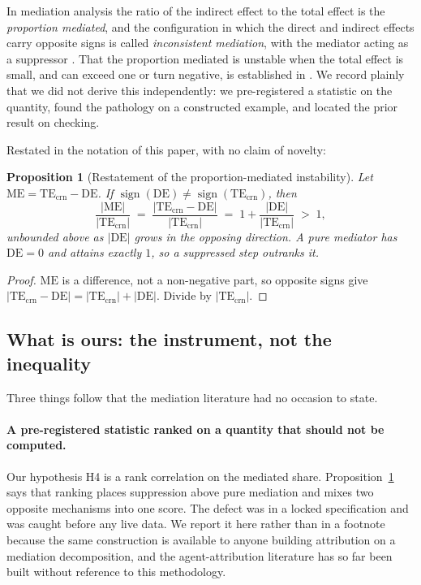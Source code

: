 \documentclass[11pt]{article}
\newtheorem{proposition}{Proposition}
\theoremstyle{remark}
\newcommand{\TEcrn}{\mathrm{TE}_{\mathrm{crn}}}
\newcommand{\DE}{\mathrm{DE}}
\newcommand{\ME}{\mathrm{ME}}
\begin{document}
In mediation analysis the ratio of the indirect effect to the total effect is
the \emph{proportion mediated}, and the configuration in which the direct and
indirect effects carry opposite signs is called \emph{inconsistent mediation},
with the mediator acting as a suppressor \citep{mackinnon2000,kenny_mediation}.
That the proportion mediated is unstable when the total effect is small, and can
exceed one or turn negative, is established in \citet{mackinnon1995}. We record
plainly that we did not derive this independently: we pre-registered a statistic
on the quantity, found the pathology on a constructed example, and located the
prior result on checking.

Restated in the notation of this paper, with no claim of novelty:

\begin{proposition}[Restatement of the proportion-mediated instability]
\label{prop:supp}
Let $\ME = \TEcrn - \DE$. If $\operatorname{sign}(\DE) \neq
\operatorname{sign}(\TEcrn)$, then
\[
  \frac{|\ME|}{|\TEcrn|} \;=\; \frac{|\TEcrn - \DE|}{|\TEcrn|}
  \;=\; 1 + \frac{|\DE|}{|\TEcrn|} \;>\; 1 ,
\]
unbounded above as $|\DE|$ grows in the opposing direction. A pure mediator has
$\DE = 0$ and attains exactly $1$, so a suppressed step outranks it.
\end{proposition}

\begin{proof}
$\ME$ is a difference, not a non-negative part, so opposite signs give
$|\TEcrn - \DE| = |\TEcrn| + |\DE|$. Divide by $|\TEcrn|$.
\end{proof}

\subsection{What is ours: the instrument, not the inequality}

Three things follow that the mediation literature had no occasion to state.

\paragraph{A pre-registered statistic ranked on a quantity that should not be
computed.} Our hypothesis H4 is a rank correlation on the mediated share.
Proposition~\ref{prop:supp} says that ranking places suppression above pure
mediation and mixes two opposite mechanisms into one score. The defect was in a
locked specification and was caught before any live data. We report it here
rather than in a footnote because the same construction is available to anyone
building attribution on a mediation decomposition, and the agent-attribution
literature has so far been built without reference to this methodology.
\end{document}
